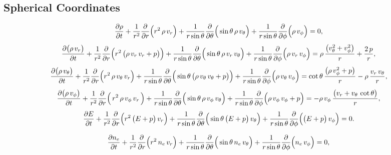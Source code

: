 \documentclass[10pt,preprint]{aastex}
\begin{document}
\subsection{Spherical Coordinates}

\begin{equation}
  \frac{\partial \rho}{\partial t}
  +\frac{1}{r^{2}}\frac{\partial }{\partial r}\Big(r^{2}\,\rho\,v_{r}\Big)
  +\frac{1}{r\sin\theta}\frac{\partial }{\partial \theta}\Big(\sin\theta\,\rho\,v_{\theta}\Big)
  +\frac{1}{r\sin\theta}\frac{\partial }{\partial \phi}\Big(\rho\,v_{\phi}\Big)=0,
\end{equation}
\begin{equation}
  \frac{\partial \big(\rho\,v_{r}\big)}{\partial t}
  +\frac{1}{r^{2}}\frac{\partial }{\partial r}\Big(r^{2}\,\big(\rho\,v_{r}\,v_{r}+p\big)\Big)
  +\frac{1}{r\sin\theta}\frac{\partial }{\partial \theta}\Big(\sin\theta\,\rho\,v_{r}\,v_{\theta}\Big)
  +\frac{1}{r\sin\theta}\frac{\partial }{\partial \phi}\Big(\rho\,v_{r}\,v_{\phi}\Big)
  =\rho\,\frac{\big(v_{\theta}^{2}+v_{\phi}^{2}\big)}{r}+\frac{2\,p}{r},
\end{equation}
\begin{equation}
  \frac{\partial \big(\rho\,v_{\theta}\big)}{\partial t}
  +\frac{1}{r^{2}}\frac{\partial }{\partial r}\Big(r^{2}\,\rho\,v_{\theta}\,v_{r}\Big)
  +\frac{1}{r\sin\theta}\frac{\partial }{\partial \theta}\Big(\sin\theta\,\big(\rho\,v_{\theta}\,v_{\theta}+p\big)\Big)
  +\frac{1}{r\sin\theta}\frac{\partial }{\partial \phi}\Big(\rho\,v_{\theta}\,v_{\phi}\Big)
  =\cot\theta\,\frac{\big(\rho\,v_{\phi}^{2}+p\big)}{r}-\rho\,\frac{v_{r}\,v_{\theta}}{r},
\end{equation}
\begin{equation}
  \frac{\partial \big(\rho\,v_{\phi}\big)}{\partial t}
  +\frac{1}{r^{2}}\frac{\partial }{\partial r}\Big(\,r^{2}\,\rho\,v_{\phi}\,v_{r}\,\Big)
  +\frac{1}{r\sin\theta}\frac{\partial }{\partial \theta}\Big(\sin\theta\,\rho\,v_{\phi}\,v_{\theta}\Big)
  +\frac{1}{r\sin\theta}\frac{\partial }{\partial \phi}\Big(\rho\,v_{\phi}\,v_{\phi}+p\Big)
  =-\rho\,v_{\phi}\,\frac{\big(v_{r}+v_{\theta}\,\cot\theta\big)}{r},
\end{equation}
\begin{equation}
  \frac{\partial E}{\partial t}
  +\frac{1}{r^{2}}\frac{\partial }{\partial r}\Big(r^{2}\,\big(E+p\big)\,v_{r}\Big)
  +\frac{1}{r\sin\theta}\frac{\partial }{\partial \theta}\Big(\sin\theta\,\big(E+p\big)\,v_{\theta}\Big)
  +\frac{1}{r\sin\theta}\frac{\partial }{\partial \phi}\Big(\big(E+p\big)\,v_{\phi}\Big)=0.
\end{equation}

\begin{equation}
  \frac{\partial n_{e}}{\partial t}
  +\frac{1}{r^{2}}\frac{\partial }{\partial r}\Big(r^{2}\,n_{e}\,v_{r}\Big)
  +\frac{1}{r\sin\theta}\frac{\partial }{\partial \theta}\Big(\sin\theta\,n_{e}\,v_{\theta}\Big)
  +\frac{1}{r\sin\theta}\frac{\partial }{\partial \phi}\Big(n_{e}\,v_{\phi}\Big)=0,
\end{equation}
\end{document}
